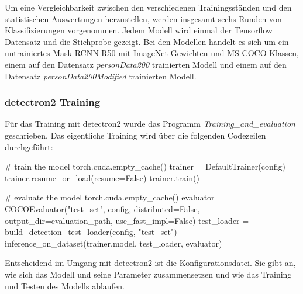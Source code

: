 \documentclass[a4paper,12pt,ngerman]{article}
\begin{document}
Um eine Vergleichbarkeit zwischen den verschiedenen Trainingsständen und den statistischen Auswertungen herzustellen, werden insgesamt sechs Runden von Klassifizierungen vorgenommen. Jedem Modell wird einmal der Tensorflow Datensatz und die Stichprobe gezeigt. Bei den Modellen handelt es sich um ein untrainiertes Mask-RCNN R50 mit ImageNet Gewichten und MS COCO Klassen, einem auf den Datensatz \textit{personData200} trainierten Modell und einem auf den Datensatz \textit{personData200Modified} trainierten Modell. \\

\subsubsection{detectron2 Training}

Für das Training mit detectron2 wurde das Programm \textit{Training\_and\_evaluation} geschrieben. Das eigentliche Training wird über die folgenden Codezeilen durchgeführt: \\

\begin{python}
	# train the model
    torch.cuda.empty_cache()
    trainer = DefaultTrainer(config)
    trainer.resume_or_load(resume=False)
    trainer.train()

    # evaluate the model
    torch.cuda.empty_cache()
    evaluator = COCOEvaluator("test_set", config, distributed=False, output_dir=evaluation_path, use_fast_impl=False)
    test_loader = build_detection_test_loader(config, "test_set")
    inference_on_dataset(trainer.model, test_loader, evaluator)
\end{python}

Entscheidend im Umgang mit detectron2 ist die Konfigurationsdatei. Sie gibt an, wie sich das Modell und seine Parameter zusammensetzen und wie das Training und Testen des Modells ablaufen. \\
\end{document}
